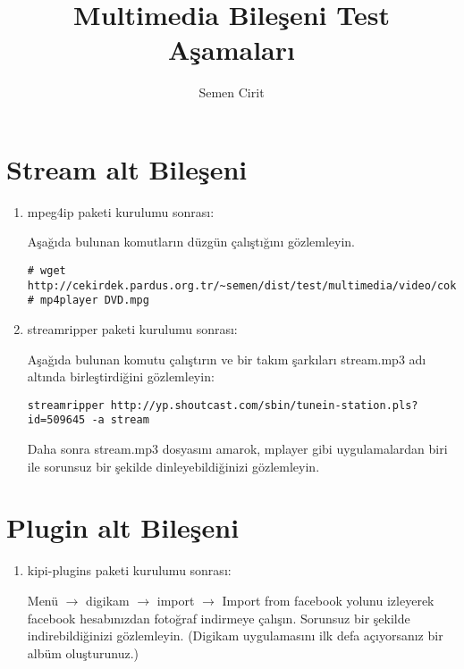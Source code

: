 \documentclass[a4paper,10pt]{article}
\title{Multimedia Bileşeni Test Aşamaları}
\author{Semen Cirit}
\begin{document}
\maketitle
\section{Stream alt Bileşeni}
\begin{enumerate}
 \item mpeg4ip paketi kurulumu sonrası:

Aşağıda bulunan komutların düzgün çalıştığını gözlemleyin.
\begin{verbatim}
# wget http://cekirdek.pardus.org.tr/~semen/dist/test/multimedia/video/cokluortam/DVD.mpg 
# mp4player DVD.mpg
\end{verbatim}


 \item streamripper paketi kurulumu sonrası:

Aşağıda bulunan komutu çalıştırın ve bir takım şarkıları stream.mp3 adı altında birleştirdiğini gözlemleyin:
\begin{verbatim}
streamripper http://yp.shoutcast.com/sbin/tunein-station.pls?id=509645 -a stream 
\end{verbatim}

Daha sonra stream.mp3 dosyasını amarok, mplayer gibi uygulamalardan biri ile sorunsuz bir şekilde dinleyebildiğinizi gözlemleyin.

\end{enumerate}


\section{Plugin alt Bileşeni}
\begin{enumerate}
 \item kipi-plugins paketi kurulumu sonrası:

Menü $\rightarrow$ digikam $\rightarrow$ import $\rightarrow$ Import from facebook yolunu izleyerek facebook hesabınızdan fotoğraf indirmeye çalışın. Sorunsuz bir şekilde indirebildiğinizi gözlemleyin. (Digikam uygulamasını ilk defa açıyorsanız bir albüm oluşturunuz.)
\end{enumerate}
\end{document}
